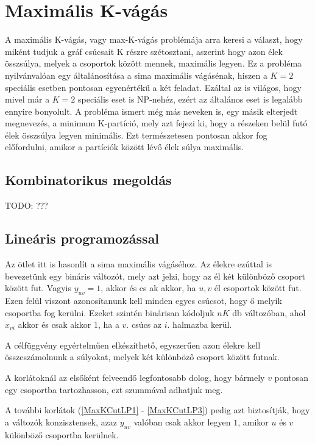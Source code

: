 \section{Maximális K-vágás}\label{sec:theoryMaxKCut}

A maximális K-vágás, vagy max-K-vágás problémája arra keresi a választ, hogy miként tudjuk a gráf csúcsait K részre szétosztani, aszerint hogy azon élek összsúlya, melyek a csoportok között mennek, maximális legyen. Ez a probléma nyilvánvalóan egy általánosítása a sima maximális vágásénak, hiszen a $K=2$ speciális esetben pontosan egyenértékű a két feladat. Ezáltal az is világos, hogy mivel már a $K=2$ speciális eset is NP-nehéz, ezért az általános eset is legalább ennyire bonyolult.
A probléma ismert még más neveken is, egy másik elterjedt megnevezés, a minimum K-partíció, mely azt fejezi ki, hogy a részeken belül futó élek összsúlya legyen minimális. Ezt természetesen pontosan akkor fog előfordulni, amikor a partíciók között lévő élek súlya maximális.

\subsection{Kombinatorikus megoldás}\label{sec:theoryMaxKCutComb}
TODO: ???

\subsection{Lineáris programozással}\label{sec:theoryMaxKCutLP}

Az ötlet itt is hasonlít a sima maximális vágáséhoz. Az élekre ezúttal is bevezetünk egy bináris változót, mely azt jelzi, hogy az él két különböző csoport között fut. Vagyis $y_{uv}=1$, akkor és cs
ak akkor, ha $u, v$ él csoportok között fut. Ezen felül viszont azonosítanunk kell minden egyes csúcsot, hogy ő melyik csoportba fog kerülni. Ezeket szintén binárisan kódoljuk $nK$ db változóban, ahol $x_{vi}$ akkor és csak akkor 1, ha a $v.$ csúcs az $i.$ halmazba kerül. 

A célfüggvény egyértelműen elkészíthető, egyszerűen azon élekre kell összeszámolnunk a súlyokat, melyek két különböző csoport között futnak.

A korlátoknál az elsőként felveendő legfontosabb dolog, hogy bármely $v$ pontosan egy csoportba tartozhasson, ezt  szummával adhatjuk meg.

A további korlátok (\ref{MaxKCutLP1} - \ref{MaxKCutLP3}) pedig azt biztosítják, hogy a változók konzisztensek, azaz $y_{uv}$ valóban csak akkor legyen $1$, amikor $u$ és $v$ különböző csoportba kerülnek.

